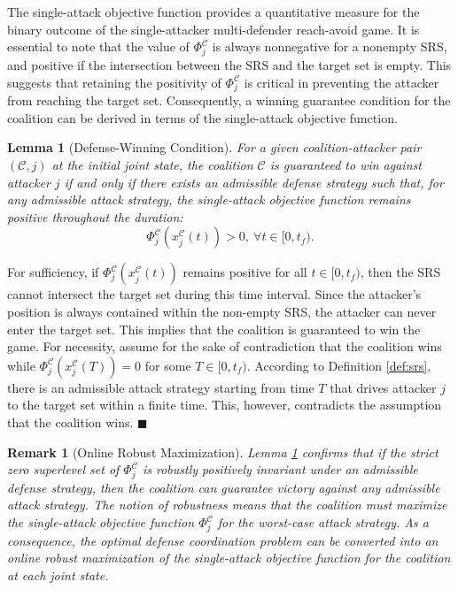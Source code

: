 \documentclass[journal]{IEEEtran}
\newtheorem{Lemma}{\bf Lemma}
\newtheorem{Remark}{\bf Remark}
\newenvironment{Proof}{\noindent{\em Proof:\/}}{\hfill $\blacksquare$\par}
\newcommand{\C}{\mathcal{C}}
\newcommand{\1}{\mathbf{1}}
\begin{document}
The single-attack objective function provides a quantitative measure for the binary outcome of the single-attacker multi-defender reach-avoid game. It is essential to note that the value of $\Phi^\C_j$ is always nonnegative for a nonempty SRS, and positive if the intersection between the SRS and the target set is empty. This suggests that retaining the positivity of $\Phi^\C_j$ is critical in preventing the attacker from reaching the target set. Consequently, a winning guarantee condition for the coalition can be derived in terms of the single-attack objective function. 

\begin{Lemma}[Defense-Winning Condition]\label{lem:dwc}
For a given coalition-attacker pair $(\C,j)$ at the initial joint state, the coalition $\C$ is guaranteed to win against attacker $j$ if and only if there exists an admissible defense strategy such that, for any admissible attack strategy, the single-attack objective function remains positive throughout the duration:
\begin{equation*}
    \Phi^\C_j(x^\C_j(t))>0,~\forall t\in[0,t_f).
\end{equation*}
\end{Lemma}

\begin{Proof}
For sufficiency, if $\Phi^\C_j(x^\C_j(t))$ remains positive for all $t\in[0,t_f)$, then the SRS cannot intersect the target set during this time interval. Since the attacker's position is always contained within the non-empty SRS, the attacker can never enter the target set. This implies that the coalition is guaranteed to win the game. For necessity, assume for the sake of contradiction that the coalition wins while $\Phi^\C_j(x^\C_j(T))=0$ for some $T\in [0,t_f)$. According to Definition \ref{def:srs}, there is an admissible attack strategy starting from time $T$ that drives attacker $j$ to the target set within a finite time. This, however, contradicts the assumption that the coalition wins.
\end{Proof}

\begin{Remark}[Online Robust Maximization]
Lemma \ref{lem:dwc} confirms that if the strict zero superlevel set of $\Phi^\C_j$ is \textit{robustly positively invariant} \cite{blanchini1999set} under an admissible defense strategy, then the coalition can guarantee victory against any admissible attack strategy. The notion of robustness means that the coalition must maximize the single-attack objective function $\Phi^\C_j$ for the worst-case attack strategy. As a consequence, the optimal defense coordination problem can be converted into an online robust maximization of the single-attack objective function for the coalition at each joint state.
\end{Remark}
\end{document}
